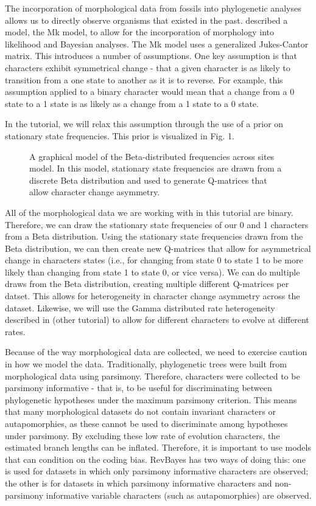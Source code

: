The incorporation of morphological data from fossils into phylogenetic analyses allows us to directly observe organisms that existed in the past.
\citet{Lewis2001} described a model, the Mk model, to allow for the incorporation of morphology into likelihood and Bayesian analyses.
The Mk model uses a generalized Jukes-Cantor matrix.
This introduces a number of assumptions. 
One key assumption is that characters exhibit symmetrical change - that a given character is as likely to transition from a one state to another as it is to reverse.
For example, this assumption applied to a binary character would mean that a change from a 0 state to a 1 state is as likely as a change from a 1 state to a 0 state. \par
In the tutorial, we will relax this assumption through the use of a prior on stationary state frequencies. 
This prior is visualized in Fig. 1. 
\begin{figure}[h!]
\centering
{}
\caption{\small A graphical model of the Beta-distributed frequencies across sites model. In this model, stationary state frequencies are drawn from a discrete Beta distribution and used to generate Q-matrices that allow character change asymmetry.}
\label{fig:morpho_gm}
\end{figure}
All of the morphological data we are working with in this tutorial are binary.  
Therefore, we can draw the stationary state frequencies of our 0 and 1 characters from a Beta distribution. 
Using the stationary state frequencies drawn from the Beta distribution, we can then create new Q-matrices that allow for asymmetrical change in characters states (i.e., for changing from state 0 to state 1 to be more likely than changing from state 1 to state 0, or vice versa). 
We can do multiple draws from the Beta distribution, creating multiple different Q-matrices per datset.
This allows for heterogeneity in character change asymmetry across the dataset. 
Likewise, we will use the Gamma distributed rate heterogeneity described in (other tutorial) to allow for different characters to evolve at different rates.\par

Because of the way morphological data are collected, we need to exercise caution in how we model the data. 
Traditionally, phylogenetic trees were built from morphological data using parsimony. 
Therefore, characters were collected to be parsimony informative - that is, to be useful for discriminating between phylogenetic hypotheses under the maximum parsimony criterion.
This means that many morphological datasets do not contain invariant characters or autapomorphies, as these cannot be used to discriminate among hypotheses under parsimony. 
By excluding these low rate of evolution characters, the estimated branch lengths can be inflated.
Therefore, it is important to use models that can condition on the coding bias. 
RevBayes has two ways of doing this: one is used for datasets in which only parsimony informative characters are observed; the other is for datasets in which parsimony informative characters and non-parsimony informative variable characters (such as autapomorphies) are observed. \par


